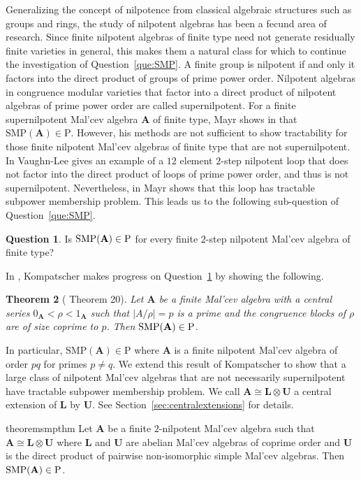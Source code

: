 \documentclass[12pt]{amsart}
\numberwithin{equation}{section}
\theoremstyle{plain}
\newtheorem{theorem}{Theorem}[section]
\theoremstyle{definition}
\newtheorem{que}[theorem]{Question}
\newcommand{\A}{\mathbf{A}}
\renewcommand{\L}{\mathbf{L}}
\newcommand{\U}{\mathbf{U}}
\newcommand{\SMP}{\text{SMP}}
\begin{document}
Generalizing the concept of nilpotence from classical algebraic structures such as groups and rings,
  the study of nilpotent algebras has been a fecund area of research.
Since finite nilpotent algebras of finite type need not generate residually finite varieties in general,
  this makes them a natural class for which to continue the investigation of Question~\ref{que:SMP}.
A finite group is nilpotent if and only it factors into the direct product of groups of prime power order.
Nilpotent algebras in congruence modular varieties that factor into a direct product of nilpotent algebras
  of prime power order are called supernilpotent.
For a finite supernilpotent Mal'cev algebra $\A$ of finite type, Mayr shows  in \cite{Ma:SMP} that $\SMP(\A) \in \text{P}$. 
However, his methods are not sufficient to show tractability for those finite nilpotent Mal'cev algebras 
  of finite type that are not supernilpotent.
In \cite{Va:NPV} Vaughn-Lee gives an example of a $12$ element $2$-step nilpotent loop 
  that does not factor into the direct product of loops of prime power order, and thus is not supernilpotent. 
Nevertheless, in \cite{Ma:VLL} Mayr shows that this loop has tractable subpower membership problem.
This leads us to the following sub-question of Question~\ref{que:SMP}.

\begin{que} \label{que:SMPnilpotent}
Is $\textup{SMP}(\A) \in \textup{P}$ for every finite $2$-step nilpotent Mal'cev algebra of finite type?
\end{que}

In \cite{Kom:SMP}, Kompatscher makes progress on Question~\ref{que:SMPnilpotent} by showing the following.
\begin{theorem}[\cite{Kom:SMP} Theorem 20] 
  Let $\A$ be a finite Mal'cev algebra with a central series $0_\A < \rho < 1_\A$ such that $|A/\rho| = p$ is a prime 
  and the congruence blocks of $\rho$ are of size coprime to $p$. 
  Then $\textup{SMP}(\A) \in \textup{P}$.
\end{theorem}

In particular, $\SMP(\A) \in \text{P}$ where $\A$ is a finite nilpotent Mal'cev algebra of order $pq$ for primes $p \ne q$. 
We extend this result of Kompatscher to show that a large class of nilpotent Mal'cev algebras 
  that are not necessarily supernilpotent  have tractable subpower membership problem.
We call $\A \cong \L \otimes \U$ a central extension of $\L$ by $\U$. 
See Section~\ref{sec:centralextensions} for details.

\begin{restatable}{theorem}{smpthm}
     \label{thm:SMPmain} 
  Let $\A$ be a finite $2$-nilpotent Mal'cev algebra such that $\A \cong \L \otimes \U$ 
    where $\L$ and $\U$ are abelian Mal'cev algebras of coprime order and $\U$ is the direct product 
    of pairwise non-isomorphic simple Mal'cev algebras. 
  Then $\textup{SMP}(\A) \in \textup{P}$. 
\end{restatable}
\end{document}
